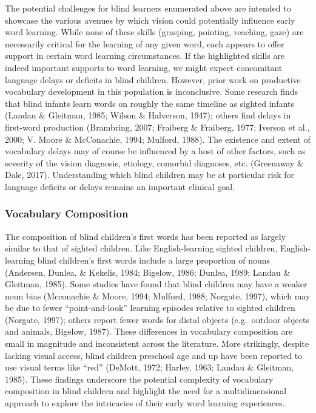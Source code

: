 \documentclass[
  man,floatsintext]{apa6}
\begin{document}
The potential challenges for blind learners enumerated above are intended to showcase the various avenues by which vision could potentially influence early word learning. While none of these skills (grasping, pointing, reaching, gaze) are necessarily critical for the learning of any given word, each appears to offer support in certain word learning circumstances. If the highlighted skills are indeed important supports to word learning, we might expect concomitant language delays or deficits in blind children. However, prior work on productive vocabulary development in this population is inconclusive. Some research finds that blind infants learn words on roughly the same timeline as sighted infants (Landau \& Gleitman, 1985; Wilson \& Halverson, 1947); others find delays in first-word production (Brambring, 2007; Fraiberg \& Fraiberg, 1977; Iverson et al., 2000; V. Moore \& McConachie, 1994; Mulford, 1988). The existence and extent of vocabulary delays may of course be influenced by a host of other factors, such as severity of the vision diagnosis, etiology, comorbid diagnoses, etc. (Greenaway \& Dale, 2017). Understanding which blind children may be at particular risk for language deficits or delays remains an important clinical goal.

\hypertarget{vocabulary-composition}{%
\subsubsection{Vocabulary Composition}\label{vocabulary-composition}}

The composition of blind children's first words has been reported as largely similar to that of sighted children. Like English-learning sighted children, English-learning blind children's first words include a large proportion of nouns (Andersen, Dunlea, \& Kekelis, 1984; Bigelow, 1986; Dunlea, 1989; Landau \& Gleitman, 1985). Some studies have found that blind children may have a weaker noun bias (Mcconachie \& Moore, 1994; Mulford, 1988; Norgate, 1997), which may be due to fewer ``point-and-look'' learning episodes relative to sighted children (Norgate, 1997); others report fewer words for distal objects (e.g.~outdoor objects and animals, Bigelow, 1987). These differences in vocabulary composition are small in magnitude and inconsistent across the literature. More strikingly, despite lacking visual access, blind children preschool age and up have been reported to use visual terms like ``red'' (DeMott, 1972; Harley, 1963; Landau \& Gleitman, 1985). These findings underscore the potential complexity of vocabulary composition in blind children and highlight the need for a multidimensional approach to explore the intricacies of their early word learning experiences.
\end{document}
